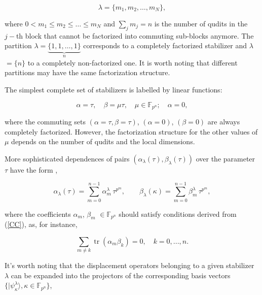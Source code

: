 \documentclass[quantumrep,article,submit,pdftex,moreauthors]{Definitions/mdpi}
\DeclareMathOperator{\tr}{tr}
\begin{document}
\begin{equation}
  \lambda = \{m_{1}, m_{2}, \ldots, m_{N}\},
  \label{curve_part}
\end{equation}

where $0<m_{1}\leq m_{2}\leq \ldots \leq m_{N}$ and $\sum_{j}m_{j}=n$
is the number of qudits in the $j-$th block that cannot be factorized into
commuting sub-blocks anymore. The partition $\lambda =\underbrace{\{1,1,\ldots
,1\}}_{n}$ corresponds to a completely factorized stabilizer and $\lambda $
$=\{n\}$ to a completely non-factorized one. It is worth noting that different
partitions may have the same factorization structure.

The simplest complete set of stabilizers is labelled by linear functions: 

\begin{equation}
  \alpha = \tau,
  \quad \beta = \mu \tau,
  \quad \mu \in \mathbb{F}_{p^{n}};
  \quad \alpha = 0,
  \label{rays}
\end{equation}

where the commuting sets $\left(\alpha = \tau, \beta = \tau \right)$, $\left(
\alpha = 0\right)$, $\left(\beta = 0\right)$ are always completely factorized.
However, the factorization structure for the other values of $\mu$ depends on
the number of qudits and the local dimensions.

More sophisticated dependences of pairs
$\left(\alpha_{\lambda}(\tau),\beta_{\lambda }(\tau)\right)$ over the parameter
$\tau$ have the form \cite{GS2,JPA09}, 

\begin{equation}
  \alpha_{\lambda }(\tau)
  = \sum_{m=0}^{n-1} \alpha_{m}^{\lambda } \, \tau^{p^{m}},
  \qquad
  \beta_{\lambda}(\kappa)
  = \sum_{m=0}^{n-1}\beta_{m}^{\lambda} \, \tau^{p^{m}},
  \label{curve1}
\end{equation}

where the coefficients $\alpha _{m}$, $\beta _{m}$ $\in \mathbb{F}_{p^{n}}$
should satisfy conditions derived from (\ref{CC}), as, for instance, 

\begin{equation*}
  \sum_{m \neq k} \tr(\alpha_{m}\beta _{k})=0,
  \quad k = 0,...,n.
\end{equation*}

It's worth noting that the displacement operators belonging to a given
stabilizer $\lambda$ can be expanded into the projectors of the
corresponding basis vectors $\{|\psi_{\kappa }^{\lambda }\rangle, \kappa \in
\mathbb{F}_{p^{n}}\}$,
\end{document}
